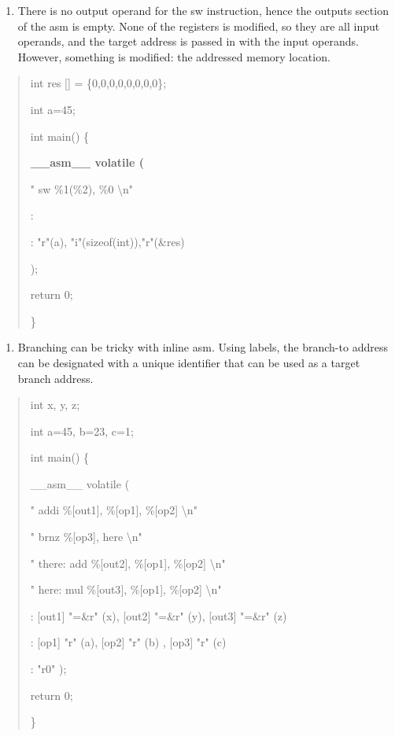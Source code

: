 \documentclass[
]{article}
\begin{document}
\begin{enumerate}
\def\labelenumi{\arabic{enumi}.}
\setcounter{enumi}{2}
\item
  There is no output operand for the sw instruction, hence the outputs
  section of the asm is empty. None of the registers is modified, so
  they are all input operands, and the target address is passed in with
  the input operands. However, something is modified: the addressed
  memory location.
\end{enumerate}

\begin{quote}
int res {[}{]} = \{0,0,0,0,0,0,0,0\};

int a=45;

int main() \{

\textbf{\_\_asm\_\_ volatile (}

" sw \%1(\%2), \%0 \textbackslash n"

:

: "r"(a), "i"(sizeof(int)),"r"(\&res)

);

return 0;

\}
\end{quote}

\begin{enumerate}
\def\labelenumi{\arabic{enumi}.}
\setcounter{enumi}{3}
\item
  Branching can be tricky with inline asm. Using labels, the branch-to
  address can be designated with a unique identifier that can be used as
  a target branch address.
\end{enumerate}

\begin{quote}
int x, y, z;

int a=45, b=23, c=1;

int main() \{

\_\_asm\_\_ volatile (

" addi \%{[}out1{]}, \%{[}op1{]}, \%{[}op2{]} \textbackslash n"

" brnz \%{[}op3{]}, here \textbackslash n"

" there: add \%{[}out2{]}, \%{[}op1{]}, \%{[}op2{]} \textbackslash n"

" here: mul \%{[}out3{]}, \%{[}op1{]}, \%{[}op2{]} \textbackslash n"

: {[}out1{]} "=\&r" (x), {[}out2{]} "=\&r" (y), {[}out3{]} "=\&r" (z)

: {[}op1{]} "r" (a), {[}op2{]} "r" (b) , {[}op3{]} "r" (c)

: "r0" );

return 0;

\}
\end{quote}
\end{document}
